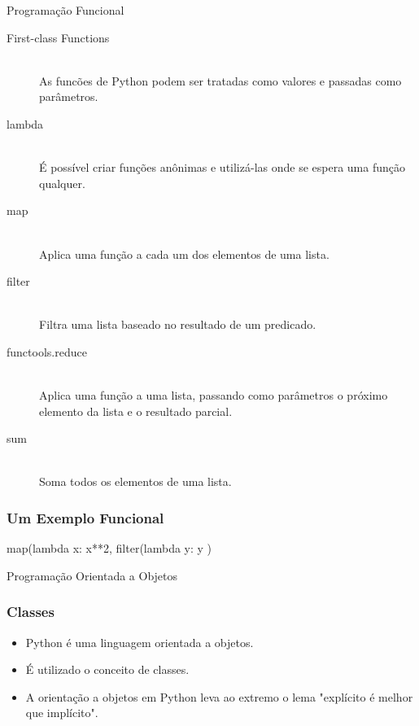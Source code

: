 \begin{frame}
    \begin{center}
        \Huge Programação Funcional
    \end{center}
\end{frame}

\begin{frame}
    \footnotesize
    \begin{description}
        \item[First-class Functions] \hfill \\ As funcões de Python podem ser
        tratadas como valores e passadas como parâmetros.
        \item[lambda] \hfill \\  É possível criar funções anônimas e utilizá-las
        onde se espera uma função qualquer.
        \item[map]  \hfill \\ Aplica uma função a cada um dos elementos de uma lista.
        \item[filter]  \hfill \\ Filtra uma lista baseado no resultado de um predicado.
        \item[functools.reduce]  \hfill \\ Aplica uma função a uma lista, passando como
        parâmetros o próximo elemento da lista e o resultado parcial.
        \item[sum]  \hfill \\ Soma todos os elementos de uma lista.
    \end{description}
\end{frame}

\begin{frame}[fragile]
    \frametitle{Um Exemplo Funcional}
    \begin{python}
        map(lambda x: x**2,
            filter(lambda y: y %
        )
    \end{python}
\end{frame}


\begin{frame}
    \begin{center}
        \Huge Programação Orientada a Objetos
    \end{center}
\end{frame}
\begin{frame}
    \frametitle{Classes}
    \begin{itemize}
        \setlength\itemsep{1.5em}
        \item Python é uma linguagem orientada a objetos.
        \item É utilizado o conceito de classes.
        \item A orientação a objetos em Python leva ao extremo o
        lema "explícito é melhor que implícito".
    \end{itemize}
\end{frame}


